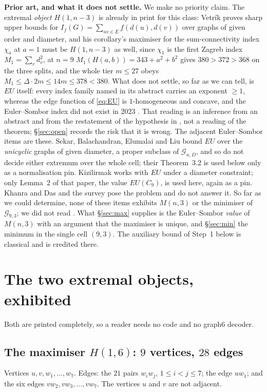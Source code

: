 \documentclass[11pt]{amsart}
\theoremstyle{remark}
\newcommand{\EU}{\mathit{EU}}
\newcommand{\Gnd}{\mathcal G}
\begin{document}
\medskip
\noindent\textbf{Prior art, and what it does not settle.} We make no priority
claim. The extremal \emph{object} $H(1,n-3)$ is already in print for this
class: Vetr\'ik \cite{Vetrik} proves sharp upper bounds for
$I_f(G)=\sum_{uv\in E}f(d(u),d(v))$ over graphs of given order and diameter,
and his corollary's maximiser for the sum-connectivity index $\chi_a$ at $a=1$
must be $H(1,n-3)$ as well, since $\chi_1$ is the first Zagreb index
$M_1=\sum_vd_v^2$, at $n=9$ $M_1(H(a,b))=343+a^2+b^2$ gives $380>372>368$ on
the three splits, and the whole tier $m\le27$ obeys
$M_1\le\Delta\cdot2m\le14m\le378<380$. What \cite{Vetrik} does not settle, so
far as we can tell, is $\EU$ itself: every index family named in its abstract
carries an exponent $\ge1$, whereas the edge function of \eqref{eq:EU} is
$1$-homogeneous and concave, and the Euler--Sombor index did not exist in 2023
\cite{TangEtAl}. That reading is an inference from an abstract and from the
restatement of the hypothesis in \cite{VetrikDML}, not a reading of the
theorem; \S\ref{sec:open} records the risk that it is wrong. The adjacent
Euler--Sombor items are these. Sekar, Balachandran, Elumalai and Liu
\cite{Sekar} bound $\EU$ over the \emph{unicyclic} graphs of given diameter, a
proper subclass of $\Gnd_{n,D}$, and so do not decide either extremum over the
whole cell; their Theorem~3.2 is used below only as a normalisation pin.
Kizilirmak \cite{Kizilirmak} works with $\EU$ under a diameter constraint;
only Lemma~2 of that paper, the value $\EU(C_9)$, is used here, again as a pin.
Khanra and Das \cite{KhanraDas} and the survey \cite{Survey} pose the problem
and do not answer it. So far as we could determine, none of these items
exhibits $M(n,3)$ or the minimiser of $\Gnd_{9,3}$; we did not read
\cite{Vetrik}.
What \S\ref{sec:max} supplies is the Euler--Sombor \emph{value} of $M(n,3)$
with an argument that the maximiser is unique, and \S\ref{sec:min} the minimum
in the single cell $(9,3)$. The auxiliary bound of Step~1 below is classical
and is credited there.

\section{The two extremal objects, exhibited}\label{sec:objects}

Both are printed completely, so a reader needs no code and no graph6 decoder.

\subsection*{The maximiser $H(1,6)$: $9$ vertices, $28$ edges}
Vertices $u,v,w_1,\ldots,w_7$. Edges: the $21$ pairs $w_iw_j$,
$1\le i<j\le7$; the edge $uw_1$; and the six edges $vw_2,vw_3,\ldots,vw_7$.
The vertices $u$ and $v$ are not adjacent.
\end{document}
